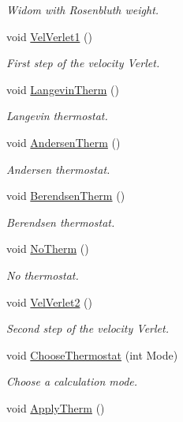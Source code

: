 \begin{DoxyCompactItemize}
\begin{DoxyCompactList}\small\item\em \-Widom with \-Rosenbluth weight. \end{DoxyCompactList}\item 
void \hyperlink{classForces_a7a55d93047438c9c5f5f9145a995e8d0}{\-Vel\-Verlet1} ()
\begin{DoxyCompactList}\small\item\em \-First step of the velocity \-Verlet. \end{DoxyCompactList}\item 
void \hyperlink{classForces_a379f6968f484a2a975c657f07821731c}{\-Langevin\-Therm} ()
\begin{DoxyCompactList}\small\item\em \-Langevin thermostat. \end{DoxyCompactList}\item 
void \hyperlink{classForces_a731619cf10a23878480c0af79252ed3e}{\-Andersen\-Therm} ()
\begin{DoxyCompactList}\small\item\em \-Andersen thermostat. \end{DoxyCompactList}\item 
void \hyperlink{classForces_a795803d47c68fef34839e68ffb2de60e}{\-Berendsen\-Therm} ()
\begin{DoxyCompactList}\small\item\em \-Berendsen thermostat. \end{DoxyCompactList}\item 
\hypertarget{classForces_ae11de37aafa6549029bdf20e36bee7f4}{void \hyperlink{classForces_ae11de37aafa6549029bdf20e36bee7f4}{\-No\-Therm} ()}\label{classForces_ae11de37aafa6549029bdf20e36bee7f4}

\begin{DoxyCompactList}\small\item\em \-No thermostat. \end{DoxyCompactList}\item 
void \hyperlink{classForces_a7965b2207a6253f8215b96a7195cb5bc}{\-Vel\-Verlet2} ()
\begin{DoxyCompactList}\small\item\em \-Second step of the velocity \-Verlet. \end{DoxyCompactList}\item 
void \hyperlink{classForces_a8de191a7e9bb4c04ea140023c0bffaba}{\-Choose\-Thermostat} (int \-Mode)
\begin{DoxyCompactList}\small\item\em \-Choose a calculation mode. \end{DoxyCompactList}\item 
\hypertarget{classForces_a0ccf73fded29832c9d6c8edad5a51b76}{void \hyperlink{classForces_a0ccf73fded29832c9d6c8edad5a51b76}{\-Apply\-Therm} ()}\label{classForces_a0ccf73fded29832c9d6c8edad5a51b76}


\end{DoxyCompactItemize}
